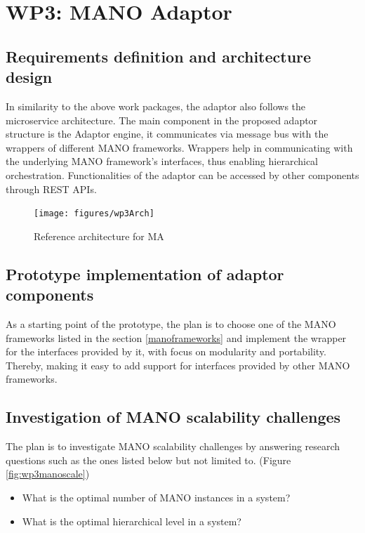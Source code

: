 \section{WP3: MANO Adaptor}

\subsection{Requirements definition and architecture design}
In similarity to the above work packages, the adaptor also follows the microservice architecture. The main component in the proposed adaptor structure is the Adaptor engine,  it communicates via message bus with the wrappers of different MANO frameworks. Wrappers help in communicating with the underlying MANO framework's interfaces, thus enabling hierarchical orchestration. Functionalities of the adaptor can be accessed by other components through REST APIs.

\begin{figure}[h]
	\centering
	\texttt{[image: figures/wp3Arch]}
	\caption{Reference architecture for MA \cite{WPDescriptionsPDF}}
	\label{fig:wp3arch}
\end{figure}

\subsection{Prototype implementation of adaptor components}

As a starting point of the prototype, the plan is to choose one of the MANO frameworks listed in the section \ref{manoframeworks} and implement the wrapper for the interfaces provided by it, with focus on modularity and portability. Thereby, making it easy to add support for interfaces provided by other MANO frameworks.

\subsection{Investigation of MANO scalability challenges}
\label{wp3manoresearch}
The plan is to investigate MANO scalability challenges by answering research questions such as the ones listed below but not limited to. (Figure \ref{fig:wp3manoscale})
\begin{itemize}
	\item What is the optimal number of MANO instances in a system?
	\item What is the optimal hierarchical level in a system?
\end{itemize}

